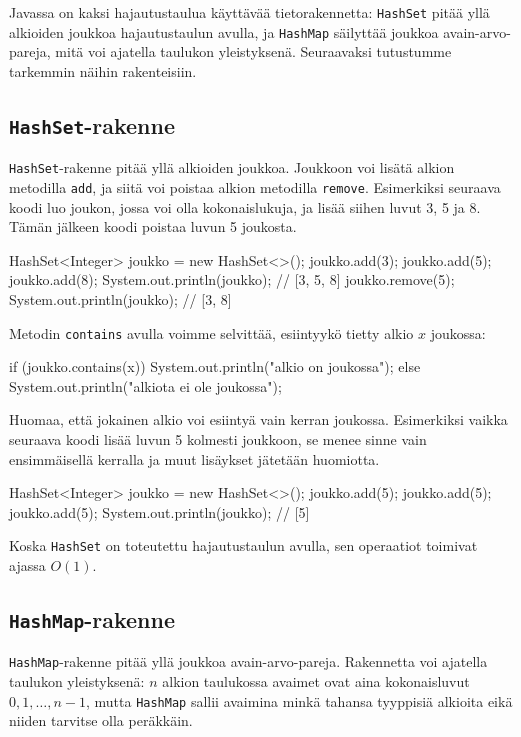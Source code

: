 Javassa on kaksi hajautustaulua käyttävää tietorakennetta:
\texttt{HashSet} pitää yllä alkioiden joukkoa
hajautustaulun avulla, ja \texttt{HashMap} säilyttää
joukkoa avain-arvo-pareja, mitä voi ajatella taulukon yleistyksenä.
Seuraavaksi tutustumme tarkemmin näihin rakenteisiin.

\subsection{\texttt{HashSet}-rakenne}

\texttt{HashSet}-rakenne pitää yllä alkioiden joukkoa.
Joukkoon voi lisätä alkion metodilla \texttt{add},
ja siitä voi poistaa alkion metodilla \texttt{remove}.
Esimerkiksi seuraava koodi luo joukon, jossa voi olla
kokonaislukuja, ja lisää siihen luvut 3, 5 ja 8.
Tämän jälkeen koodi poistaa luvun 5 joukosta.

\begin{code}
HashSet<Integer> joukko = new HashSet<>();
joukko.add(3);
joukko.add(5);
joukko.add(8);
System.out.println(joukko); // [3, 5, 8]
joukko.remove(5);
System.out.println(joukko); // [3, 8]
\end{code}

Metodin \texttt{contains} avulla voimme selvittää,
esiintyykö tietty alkio $x$ joukossa:

\begin{code}
if (joukko.contains(x)) {
    System.out.println("alkio on joukossa");
} else {
    System.out.println("alkiota ei ole joukossa");
}
\end{code}

Huomaa, että jokainen alkio voi esiintyä vain kerran joukossa.
Esimerkiksi vaikka seuraava koodi lisää luvun 5 kolmesti
joukkoon, se menee sinne vain ensimmäisellä kerralla ja
muut lisäykset jätetään huomiotta.

\begin{code}
HashSet<Integer> joukko = new HashSet<>();
joukko.add(5);
joukko.add(5);
joukko.add(5);
System.out.println(joukko); // [5]
\end{code}

Koska \texttt{HashSet} on toteutettu hajautustaulun avulla,
sen operaatiot toimivat ajassa $O(1)$.

\subsection{\texttt{HashMap}-rakenne}

\texttt{HashMap}-rakenne pitää yllä joukkoa avain-arvo-pareja.
Rakennetta voi ajatella taulukon yleistyksenä:
$n$ alkion taulukossa avaimet ovat aina kokonaisluvut
$0,1,\ldots,n-1$, mutta \texttt{HashMap} sallii
avaimina minkä tahansa tyyppisiä alkioita eikä niiden
tarvitse olla peräkkäin.

